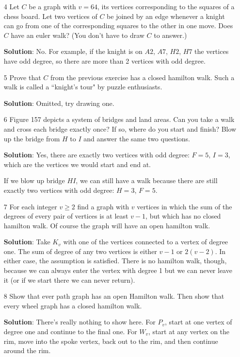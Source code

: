 \documentclass{article}
\begin{document}
\begin{enumerate}
		\item[4] Let $C$ be a graph with $v = 64$, its vertices corresponding to the squares of a chess board. Let two vertices of $C$ be joined by an edge whenever a knight can go from one of the corresponding squares to the other in one move. Does $C$ have an euler walk? (You don't have to draw $C$ to answer.)
		
		\textbf{Solution}: No. For example, if the knight is on $A2$, $A7$, $H2$, $H7$ the vertices have odd degree, so there are more than 2 vertices with odd degree.
		
		\item[5] Prove that $C$ from the previous exercise has a closed hamilton walk. Such a walk is called a ``knight's tour" by puzzle enthusiasts.
		
		\textbf{Solution}: Omitted, try drawing one.
		
		\item[6] Figure 157 depicts a system of bridges and land areas. Can you take a walk and cross each bridge exactly once? If so, where do you start and finish? Blow up the bridge from $H$ to $I$ and answer the same two questions.
		
		\textbf{Solution}: Yes, there are exactly two vertices with odd degree: $F = 5$, $I = 3$, which are the vertices we would start and end at.
		
		If we blow up bridge $HI$, we can still have a walk because there are still exactly two vertices with odd degree: $H = 3$, $F = 5$.
		
		\item[7] For each integer $v \geq 2$ find a graph with $v$ vertices in which the sum of the degrees of every pair of vertices is at least $v - 1$, but which has no closed hamilton walk. Of course the graph will have an open hamilton walk.
		
		\textbf{Solution}: Take $K_v$ with one of the vertices connected to a vertex of degree one. The sum of degree of any two vertices is either $v - 1$ or $2(v - 2)$. In either case, the assumption is satisfied. There is no hamilton walk, though, because we can always enter the vertex with degree 1 but we can never leave it (or if we start there we can never return).
		
		\item[8] Show that ever path graph has an open Hamilton walk. Then show that every wheel graph has a closed hamilton walk.
		
		\textbf{Solution}: There's really nothing to show here. For $P_v$, start at one vertex of degree one and continue to the final one. For $W_v$, start at any vertex on the rim, move into the spoke vertex, back out to the rim, and then continue around the rim.
		

\end{enumerate}
\end{document}
